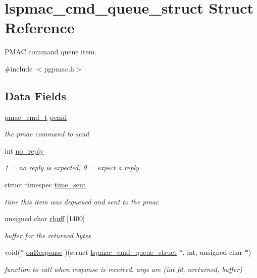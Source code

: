 \hypertarget{structlspmac__cmd__queue__struct}{\section{lspmac\-\_\-cmd\-\_\-queue\-\_\-struct Struct Reference}
\label{structlspmac__cmd__queue__struct}
}


P\-M\-A\-C command queue item.  




{\ttfamily \#include $<$pgpmac.\-h$>$}

\subsection*{Data Fields}
\begin{DoxyCompactItemize}
\item 
\hyperlink{pgpmac_8h_a2d163436571135a457f4a4e2fbd09633}{pmac\-\_\-cmd\-\_\-t} \hyperlink{structlspmac__cmd__queue__struct_a9ac7618bbe0faa3001e8efeb1d89010d}{pcmd}
\begin{DoxyCompactList}\small\item\em the pmac command to send \end{DoxyCompactList}\item 
int \hyperlink{structlspmac__cmd__queue__struct_a33f70b45f8b7c27935cd3efe28748479}{no\-\_\-reply}
\begin{DoxyCompactList}\small\item\em 1 = no reply is expected, 0 = expect a reply \end{DoxyCompactList}\item 
struct timespec \hyperlink{structlspmac__cmd__queue__struct_a276ebc4b35c2554e4cb7377b60fd89b7}{time\-\_\-sent}
\begin{DoxyCompactList}\small\item\em time this item was dequeued and sent to the pmac \end{DoxyCompactList}\item 
unsigned char \hyperlink{structlspmac__cmd__queue__struct_aa059563886db174f9bb4f7a14bc19bbe}{rbuff} \mbox{[}1400\mbox{]}
\begin{DoxyCompactList}\small\item\em buffer for the returned bytes \end{DoxyCompactList}\item 
void($\ast$ \hyperlink{structlspmac__cmd__queue__struct_afe92c0bab9f124314a6f3d8104c94364}{on\-Response} )(struct \hyperlink{structlspmac__cmd__queue__struct}{lspmac\-\_\-cmd\-\_\-queue\-\_\-struct} $\ast$, int, unsigned char $\ast$)
\begin{DoxyCompactList}\small\item\em function to call when response is received. args are (int fd, nreturned, buffer) \end{DoxyCompactList}\end{DoxyCompactItemize}


